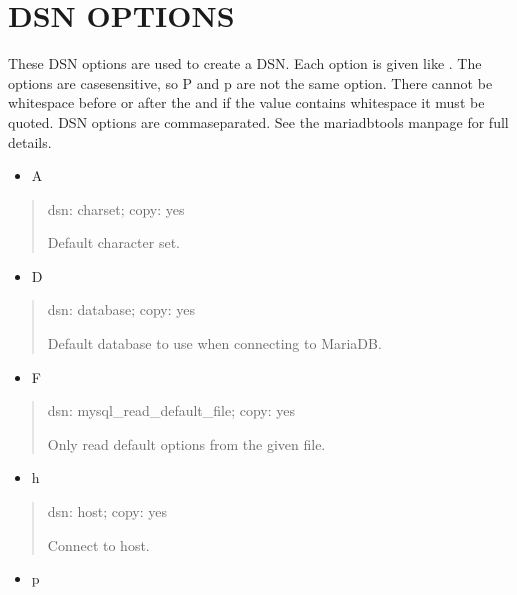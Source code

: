 \documentclass[letterpaper,10pt,english]{sphinxmanual}
\begin{document}
\section{DSN OPTIONS}
\label{\detokenize{mariadb-query-digest:dsn-options}}
These DSN options are used to create a DSN.  Each option is given like
.  The options are case\sphinxhyphen{}sensitive, so P and p are not the
same option.  There cannot be whitespace before or after the \sphinxcode{\sphinxupquote{=}} and
if the value contains whitespace it must be quoted.  DSN options are
comma\sphinxhyphen{}separated.  See the mariadb\sphinxhyphen{}tools manpage for full details.
\begin{itemize}
\item {} 
A

\end{itemize}
\begin{quote}

dsn: charset; copy: yes

Default character set.
\end{quote}
\begin{itemize}
\item {} 
D

\end{itemize}
\begin{quote}

dsn: database; copy: yes

Default database to use when connecting to MariaDB.
\end{quote}
\begin{itemize}
\item {} 
F

\end{itemize}
\begin{quote}

dsn: mysql\_read\_default\_file; copy: yes

Only read default options from the given file.
\end{quote}
\begin{itemize}
\item {} 
h

\end{itemize}
\begin{quote}

dsn: host; copy: yes

Connect to host.
\end{quote}
\begin{itemize}
\item {} 
p

\end{itemize}
\end{document}
